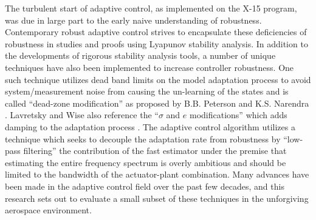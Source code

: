 The turbulent start of adaptive control, as implemented on the X-15 program, was due in large part to the early naive understanding of robustness.  Contemporary robust adaptive control strives to encapsulate these deficiencies of robustness in studies and proofs using Lyapunov stability analysis.  In addition to the developments of rigorous stability analysis tools, a number of unique techniques have also been implemented to increase controller robustness.  One such technique utilizes dead band limits on the model adaptation process to avoid system/measurement noise from causing the un-learning of the states and is called \enquote{dead-zone modification} as proposed by B.B. Peterson and K.S. Narendra \cite{peterson1982bounded}.  Lavretsky and Wise also reference the \enquote{$\sigma$ and $e$ modifications} which adds damping to the adaptation process \cite{lavretsky2013robust}.  The \Lone adaptive control algorithm utilizes a technique which seeks to decouple the adaptation rate from robustness by \enquote{low-pass filtering} the contribution of the fast estimator under the premise that estimating the entire frequency spectrum is overly ambitious and should be limited to the bandwidth of the actuator-plant combination.  Many advances have been made in the adaptive control field over the past few decades, and this research sets out to evaluate a small subset of these techniques in the unforgiving aerospace environment.

